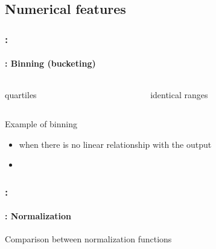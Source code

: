 \documentclass[xcolor=table]{beamer}
\begin{document}
\begin{frame}
	\frametitle{\insertshortsubtitle}
	\framesubtitle{\insertsection}
	
	
\end{frame}

\subsection{Numerical features}

\begin{frame}
	\frametitle{\insertshortsubtitle: \insertsection}
	\framesubtitle{\insertsubsection: Binning (bucketing)}
	
	\begin{columns}
		\begin{column}{0.5\textwidth}
			
			\vspace{-6pt}
			\begin{center}
				quartiles
			\end{center}
		\end{column}
		\begin{column}{0.5\textwidth}
			
			\vspace{-6pt}
			\begin{center}
				identical ranges
			\end{center}
		\end{column}
	\end{columns}

	\begin{center}
		Example of binning \cite{2021-google-prep}
	\end{center}

	\begin{itemize}
		\item when there is no linear relationship with the output
		\item {}
	\end{itemize}
	
\end{frame}

\begin{frame}
	\frametitle{\insertshortsubtitle: \insertsection}
	\framesubtitle{\insertsubsection: Normalization}
	
	
	\begin{center}
		Comparison between normalization functions \cite{2021-google-prep}
	\end{center}
	
\end{frame}
\end{document}
